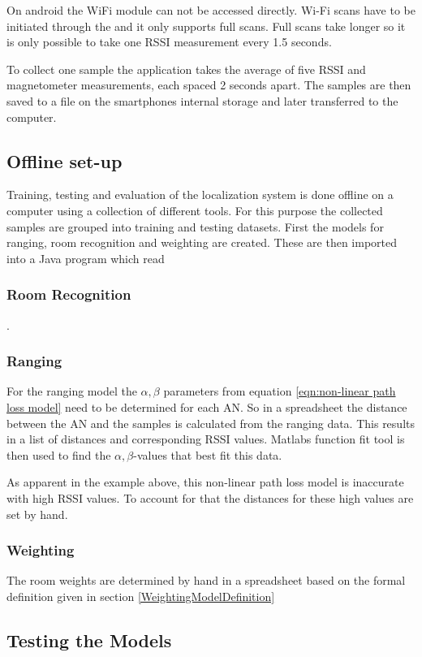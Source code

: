 On android the WiFi module can not be accessed directly. Wi-Fi scans have to be initiated through the  and it only supports full scans\cite{brouwers2014incremental}. Full scans take longer so it is only possible to take one RSSI measurement every 1.5 seconds.

To collect one sample the application takes the average of five RSSI and magnetometer measurements, each spaced 2 seconds apart. The samples are then saved to a  file on the smartphones internal storage and later transferred to the computer.

\subsection{Offline set-up}

Training, testing and evaluation of the localization system is done offline on a computer using a collection of different tools. For this purpose the collected samples are grouped into training and testing datasets. First the models for ranging, room recognition and weighting are created. These are then imported into a Java program which read

\subsubsection*{Room Recognition}
.

\subsubsection*{Ranging}
For the ranging model the \(\alpha, \beta\) parameters from equation \ref{eqn:non-linear path loss model} need to be determined for each AN. So in a spreadsheet the distance between the AN and the samples is calculated from the ranging data. This results in a list of distances and corresponding RSSI values. Matlabs function fit tool is then used to find the \(\alpha, \beta\)-values that best fit this data.

As apparent in the example above, this non-linear path loss model is inaccurate with high RSSI values. To account for that the distances for these high values are set by hand.

\subsubsection*{Weighting}

The room weights are determined by hand in a spreadsheet based on the formal definition given in section \ref{WeightingModelDefinition}

\subsection{Testing the Models}